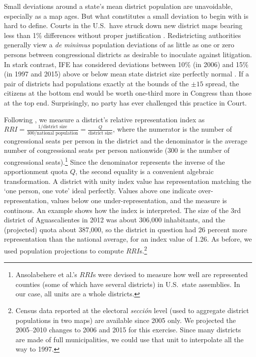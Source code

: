 \documentclass[letter,12pt]{article}
\begin{document}
Small deviations around a state's mean district population are unavoidable, especially as a map ages. But what constitutes a small deviation to begin with is hard to define. Courts in the U.S.\ have struck down new district maps bearing less than 1\% differences without proper justification \citep{tuckerApportionment.1985}. Redistricting authorities generally view a \emph{de minimus} population deviations of as little as one or zero persons between congressional districts as desirable to inoculate against litigation. In stark contrast, IFE has considered deviations between 10\% (in 2006) and 15\% (in 1997 and 2015) above or below mean state district size perfectly normal \citep{lujambio.vives.2008,trelles.mtz.polygob2012}. If a pair of districts had populations exactly at the bounds of the $\pm15$ spread, the citizens at the bottom end would be worth one-third more in Congress than those at the top end. Surprisingly, no party has ever challenged this practice in Court. 

Following \citet{ansolabehere.gerber.snyderCourtRedis2002}, we measure a district's relative representation index as $RRI = \frac{1/\text{district size}}{300/\text{national population}} = \frac{Q}{\text{district size}}$, where the numerator is the number of congressional seats per person in the district and the denominator is the average number of congressional seats per person nationwide (300 is the number of congressional seats).\footnote{Ansolabehere et al.'s $RRI$s were devised to measure how well are represented counties (some of which have several districts) in U.S.\ state assemblies. In our case, all units are a whole districts.} Since the denominator represents the inverse of the apportionment quota $Q$, the second equality is a convenient algebraic transformation. A district with unity index value has representation matching the `one person, one vote' ideal perfectly. Values above one indicate over-representation, values below one under-representation, and the measure is continous. An example shows how the index is interpreted. The size of the 3rd district of Aguascalientes in 2012 was about 306,000 inhabitants, and the (projected) quota about 387,000, so the district in question had 26 percent more representation than the national average, for an index value of 1.26. As before, we used population projections to compute $RRI$s.\footnote{Census data reported at the electoral \emph{secci\'on} level (used to aggregate district populations in two maps) are available since 2005 only. We projected the 2005--2010 changes to 2006 and 2015 for this exercise. Since many districts are made of full municipalities, we could use that unit to interpolate all the way to 1997.} 
\end{document}
